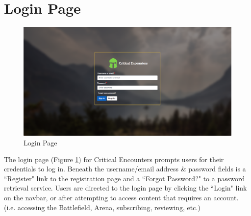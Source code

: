 \documentclass[12pt,a4paper]{report}
\begin{document}
	\section{Login Page}
	\begin{figure}[H]
		\centering
		\includegraphics[scale=.25]{login}
		\caption{Login Page}
		\label{fig: Login Page}
	\end{figure}
	The login page (Figure \ref{fig: Login Page}) for Critical Encounters prompts users for their credentials to log in. Beneath the username/email address \& password fields is a ``Register" link to the registration page and a ``Forgot Password?" to a password retrieval service. Users are directed to the login page by clicking the ``Login" link on the navbar, or after attempting to access content that requires an account. (i.e. accessing the Battlefield, Arena, subscribing, reviewing, etc.)
	\newpage
\end{document}
